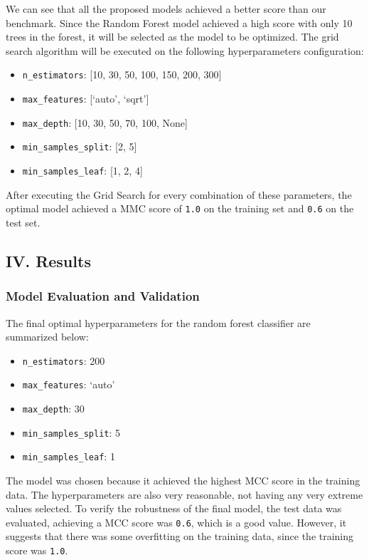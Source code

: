 \documentclass[11pt]{article}
\providecommand{\tightlist}{%
      \setlength{\itemsep}{0pt}\setlength{\parskip}{0pt}}
\begin{document}
We can see that all the proposed models achieved a better score than our
benchmark. Since the Random Forest model achieved a high score with only
10 trees in the forest, it will be selected as the model to be
optimized. The grid search algorithm will be executed on the following
hyperparameters configuration:

\begin{itemize}
\tightlist
\item
  \texttt{n\_estimators}: {[}10, 30, 50, 100, 150, 200, 300{]}
\item
  \texttt{max\_features}: {[}`auto', `sqrt'{]}
\item
  \texttt{max\_depth}: {[}10, 30, 50, 70, 100, None{]}
\item
  \texttt{min\_samples\_split}: {[}2, 5{]}
\item
  \texttt{min\_samples\_leaf}: {[}1, 2, 4{]}
\end{itemize}

After executing the Grid Search for every combination of these
parameters, the optimal model achieved a MMC score of \texttt{1.0} on
the training set and \texttt{0.6} on the test set.

    \hypertarget{iv.-results}{%
\subsection{IV. Results}\label{iv.-results}}

\hypertarget{model-evaluation-and-validation}{%
\subsubsection{Model Evaluation and
Validation}\label{model-evaluation-and-validation}}

The final optimal hyperparameters for the random forest classifier are
summarized below:

\begin{itemize}
\tightlist
\item
  \texttt{n\_estimators}: 200
\item
  \texttt{max\_features}: `auto'
\item
  \texttt{max\_depth}: 30
\item
  \texttt{min\_samples\_split}: 5
\item
  \texttt{min\_samples\_leaf}: 1
\end{itemize}

The model was chosen because it achieved the highest MCC score in the
training data. The hyperparameters are also very reasonable, not having
any very extreme values selected. To verify the robustness of the final
model, the test data was evaluated, achieving a MCC score was
\texttt{0.6}, which is a good value. However, it suggests that there was
some overfitting on the training data, since the training score was
\texttt{1.0}.
\end{document}
